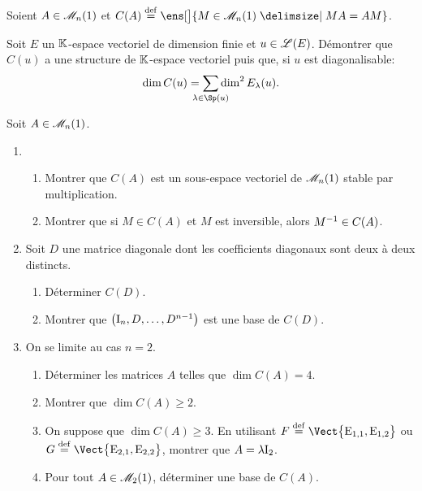 \begin{defi}
    Soient $A \in \mathscr{M}_n(1)$ et $C(A) \defeq \ens[\big]{M \in \M_n(\R) \tq MA = AM }$.
\end{defi}

\begin{exercice}
    Soit $E$ un $\mathbb{K}$-espace vectoriel de dimension finie et $u \in \mathscr{L}(E)$. Démontrer que $C(u)$ a une structure de $\mathbb{K}$-espace vectoriel puis que, si $u$ est diagonalisable:
    $$\dim C(u) = \smashoperator{\sum_{\lambda \in \Sp(u)}} \dim^2 E_\lambda(u).$$
\end{exercice}

\begin{solution}
    
\end{solution}

\begin{exercice}
    Soit $A \in \mathscr{M}_n(1)$.
    \begin{enumerate}
        \item 
        \begin{enumerate}
            \item Montrer que $C(A)$ est un sous-espace vectoriel de $\mathscr{M}_n(1)$ stable par multiplication.
            \item Montrer que si $M \in C(A)$ et $M$ est inversible, alors $M^{-1} \in C(A)$.
        \end{enumerate}
        \item Soit $D$ une matrice diagonale dont les coefficients diagonaux sont deux à deux distincts.
        \begin{enumerate}
            \item Déterminer $C(D)$.
            \item Montrer que $\big(\mathrm{I}_n, D, \dots, D^{n-1}\big)$ est une base de $C(D)$.
        \end{enumerate}
        \item On se limite au cas $n=2$.
        \begin{enumerate}
            \item Déterminer les matrices $A$ telles que $\dim C(A) = 4$.
            \item Montrer que $\dim C(A) \geqslant 2$. 
            \item On suppose que $\dim C(A) \geqslant 3$. En utilisant $F \defeq \Vect \big\{ \mathrm{E}_{1, 1}, \mathrm{E}_{1, 2} \big\}$ ou $G \defeq \Vect \big\{ \mathrm{E}_{2, 1}, \mathrm{E}_{2, 2} \big\}$, montrer que $A = \lambda \mathrm{I}_2$.
            \item Pour tout $A \in \mathscr{M}_2(1)$, déterminer une base de $C(A)$.
        \end{enumerate}
    \end{enumerate}
\end{exercice}

